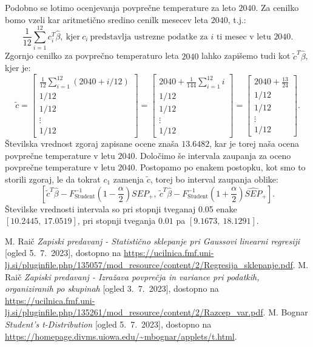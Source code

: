 \documentclass{article}
\begin{document}
Podobno se lotimo ocenjevanja povprečne temperature za leto $2040$. Za cenilko bomo vzeli kar aritmetično sredino cenilk mesecev leta $2040$, t.j.:
$$
\frac{1}{12}\sum_{i=1}^{12}{c_i^T \hat{\beta}},~\text{kjer}~c_i~\text{predstavlja ustrezne podatke za $i$ ti mesec v letu $2040$}. 
$$
Zgornjo cenilko za povprečno temperaturo leta $2040$ lahko zapišemo tudi kot $\tilde{c}^{T} \hat{\beta}$, kjer je:
$$
\tilde{c} = \begin{bmatrix}
    \frac{1}{12}\sum_{i=1}^{12}{(2040 + i/12)}\\
    1/12\\
    1/12\\
    \vdots\\
    1/12
\end{bmatrix}=
\begin{bmatrix}
    2040 + \frac{1}{144}\sum_{i=1}^{12}{i}\\
    1/12\\
    1/12\\
    \vdots\\
    1/12
\end{bmatrix}=
\begin{bmatrix}
    2040 + \frac{13}{24}\\
    1/12\\
    1/12\\
    \vdots\\
    1/12
\end{bmatrix}.
$$
Številska vrednost zgoraj zapisane ocene znaša $13.6482$, kar je torej naša ocena povprečne temperature v letu $2040$.
\newline
Določimo še intervala zaupanja za oceno povprečne temperature v letu $2040$. Postopamo po enakem postopku, kot smo to storili zgoraj, le da tokrat $c_1$ zamenja $\tilde{c}$, torej bo interval zaupanja oblike:
$$
[\tilde{c}^T\hat{\beta} - F^{-1}_{\text{Student}}\left(1 - \frac{\alpha}{2}\right)\widehat{SEP}_{+} ,~\tilde{c}^T\hat{\beta} - F^{-1}_{\text{Student}}\left(1 + \frac{\alpha}{2}\right)\widehat{SEP}_{+} ].
$$
Številske vrednosti intervala so pri stopnji tveganaj 0.05 enake $[10.2445,~17.0519]$, pri stopnji tveganja $0.01$ pa $[9.1673,~18.1291]$.








\pagebreak


\begin{thebibliography}{9}
        M. Raič \emph{Zapiski predavanj - Statistično sklepanje pri Gaussovi linearni regresiji} [ogled 5.~7.~2023], dostopno na \url{https://ucilnica.fmf.uni-lj.si/pluginfile.php/135057/mod_resource/content/2/Regresija_sklepanje.pdf}.
        M. Raič \emph{Zapiski predavanj - Izražava povprečja in variance pri podatkih, organiziranih po skupinah} [ogled 3.~7.~2023], dostopno na \url{https://ucilnica.fmf.uni-lj.si/pluginfile.php/135261/mod_resource/content/2/Razcep_var.pdf}.
        M. Bognar \emph{Student's t-Distribution} [ogled 5.~7.~2023], dostopno na \url{https://homepage.divms.uiowa.edu/~mbognar/applets/t.html}.
\end{thebibliography}
\end{document}
